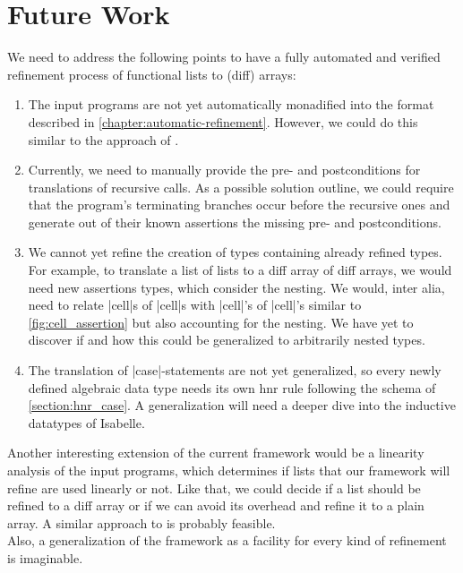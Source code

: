 \chapter{Future Work}\label{chapter:future_work}

We need to address the following points to have a fully automated and verified refinement process of functional lists to (diff) arrays:

\begin{enumerate}

\item The input programs are not yet automatically monadified into the format described in \autoref{chapter:automatic-refinement}. However, we could do this similar to the approach of \cite[p.2]{Wimmer_2018}.

\item Currently, we need to manually provide the pre- and postconditions for translations of recursive calls. As a possible solution outline, we could require that the program's terminating branches occur before the recursive ones and generate out of their known assertions the missing pre- and postconditions.

\item We cannot yet refine the creation of types containing already refined types. For example, to translate a list of lists to a diff array of diff arrays, we would need new assertions types, which consider the nesting. We would, inter alia, need to relate |cell|s of |cell|s with |cell|'s of |cell|'s similar to \autoref{fig:cell_assertion} but also accounting for the nesting. We have yet to discover if and how this could be generalized to arbitrarily nested types.

\item The translation of |case|-statements are not yet generalized, so every newly defined algebraic data type needs its own hnr rule following the schema of \autoref{section:hnr_case}. A generalization will need a deeper dive into the inductive datatypes of Isabelle.

\end{enumerate}

\noindent Another interesting extension of the current framework would be a linearity analysis of the input programs, which determines if lists that our framework will refine are used linearly or not. Like that, we could decide if a list should be refined to a diff array or if we can avoid its overhead and refine it to a plain array. A similar approach to \cite{Bernardy_2017} is probably feasible.\\
Also, a generalization of the framework as a facility for every kind of refinement is imaginable.
